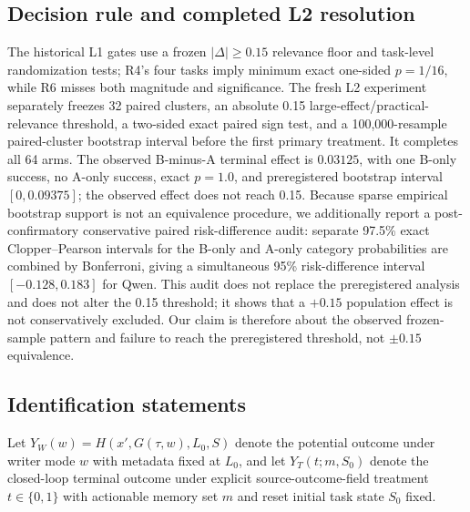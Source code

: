 \subsection{Decision rule and completed L2 resolution}
The historical L1 gates use a frozen $|\Delta|\geq0.15$ relevance floor and task-level randomization tests; R4's four tasks imply minimum exact one-sided $p=1/16$, while R6 misses both magnitude and significance. The fresh L2 experiment separately freezes 32 paired clusters, an absolute 0.15 large-effect/practical-relevance threshold, a two-sided exact paired sign test, and a 100,000-resample paired-cluster bootstrap interval before the first primary treatment. It completes all 64 arms. The observed B-minus-A terminal effect is $0.03125$, with one B-only success, no A-only success, exact $p=1.0$, and preregistered bootstrap interval $[0,0.09375]$; the observed effect does not reach 0.15. Because sparse empirical bootstrap support is not an equivalence procedure, we additionally report a post-confirmatory conservative paired risk-difference audit: separate 97.5\% exact Clopper--Pearson intervals for the B-only and A-only category probabilities are combined by Bonferroni, giving a simultaneous 95\% risk-difference interval $[-0.128,0.183]$ for Qwen. This audit does not replace the preregistered analysis and does not alter the 0.15 threshold; it shows that a $+0.15$ population effect is not conservatively excluded. Our claim is therefore about the observed frozen-sample pattern and failure to reach the preregistered threshold, not $\pm0.15$ equivalence.

\subsection{Identification statements}
Let $Y_W(w)=H(x',G(\tau,w),L_0,S)$ denote the potential outcome under writer mode $w$ with metadata fixed at $L_0$, and let $Y_T(t;m,S_0)$ denote the closed-loop terminal outcome under explicit source-outcome-field treatment $t\in\{0,1\}$ with actionable memory set $m$ and reset initial task state $S_0$ fixed.

